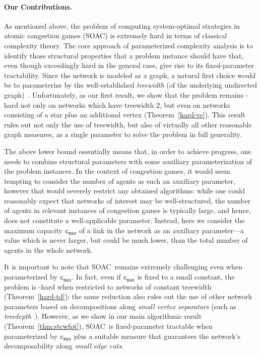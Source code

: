 \documentclass[letterpaper]{article} %
\newcommand{\problem}{{\sc SOAC}\xspace} %
\newcommand{\cmax}{\mathtt{c_{max}}}
\begin{document}
\paragraph{Our Contributions.}
As mentioned above, the problem of computing system-optimal strategies in atomic congestion games (\problem) is extremely hard in terms of classical complexity theory. The core approach of parameterized complexity analysis is to identify those structural properties that a problem instance should have that, even though exceedingly hard in the general case, give rise to its fixed-parameter tractability. Since the network is modeled as a graph, a natural first choice would be to parameterize by the well-established \emph{treewidth} (of the underlying undirected graph)~\cite{RobertsonS86}. Unfortunately, as our first result, we show that the problem remains \NP-hard not only on networks which have treewidth $2$, but even on networks consisting of a star plus an additional vertex (Theorem~\ref{hard-vc}). This result rules out not only the use of treewidth, but also of virtually all other reasonable graph measures, as a single parameter to solve the problem in full generality.

The above lower bound essentially means that, in order to achieve progress, one needs to combine structural parameters with some auxiliary parameterization of the problem instances. In the context of congestion games, it would seem tempting to consider the number of agents as such an auxiliary parameter, however that would severely restrict any obtained algorithms: while one could reasonably expect that networks of interest may be well-structured, the number of agents in relevant instances of congestion games is typically large, and hence, does not constitute a well-applicable parameter. Instead, here we consider the maximum capacity $\cmax$ of a link in the network as an auxiliary parameter---a value which is never larger, but could be much lower, than the total number of agents in the whole network.

It is important to note that \problem\ remains extremely challenging even when parameterized by $\cmax$. In fact, even if $\cmax$ is fixed to a small constant, the problem is \NP-hard when restricted to networks of constant treewidth (Theorem~\ref{hard-td}); the same reduction also rules out the use of other network parameters based on decompositions along \emph{small vertex separators} (such as \emph{treedepth}~\cite{sparsity}).
However, as we show in our main algorithmic result (Theorem~\ref{thm:stcwfpt}), \problem\ is fixed-parameter tractable when parameterized by $\cmax$ plus a suitable measure that guarantees the network's decomposability along \emph{small edge cuts}.
\end{document}
